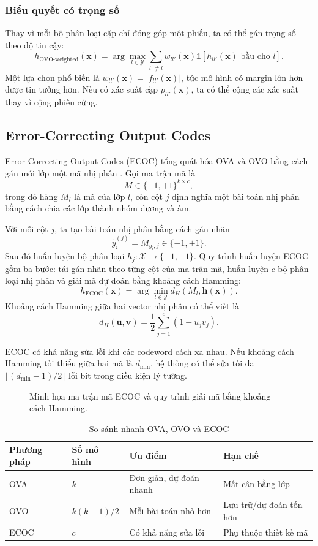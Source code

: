 \subsubsection{Biểu quyết có trọng số}

Thay vì mỗi bộ phân loại cặp chỉ đóng góp một phiếu, ta có thể gán trọng số theo độ tin cậy:
\[
  h_{\text{OVO-weighted}}(\bm{x})=\arg\max_{l\in\mathcal{Y}}\sum_{l'\neq l}w_{ll'}(\bm{x})\mathbb{1}[h_{ll'}(\bm{x})\text{ bầu cho }l].
\]
Một lựa chọn phổ biến là $w_{ll'}(\bm{x})=|f_{ll'}(\bm{x})|$, tức mô hình có margin lớn hơn được tin tưởng hơn. Nếu có xác suất cặp $p_{ll'}(\bm{x})$, ta có thể cộng các xác suất thay vì cộng phiếu cứng.

\subsection{Error-Correcting Output Codes}

Error-Correcting Output Codes (ECOC) tổng quát hóa OVA và OVO bằng cách gán mỗi lớp một mã nhị phân \cite{dietterich1995}. Gọi ma trận mã là
\[
  M\in\{-1,+1\}^{k\times c},
\]
trong đó hàng $M_l$ là mã của lớp $l$, còn cột $j$ định nghĩa một bài toán nhị phân bằng cách chia các lớp thành nhóm dương và âm.

Với mỗi cột $j$, ta tạo bài toán nhị phân bằng cách gán nhãn
\[
  \tilde{y}_i^{(j)}=M_{y_i,j}\in\{-1,+1\}.
\]
Sau đó huấn luyện bộ phân loại $h_j:\mathcal{X}\to\{-1,+1\}$. Quy trình huấn luyện ECOC gồm ba bước: tái gán nhãn theo từng cột của ma trận mã, huấn luyện $c$ bộ phân loại nhị phân và giải mã dự đoán bằng khoảng cách Hamming:
\[
  h_{\text{ECOC}}(\bm{x})=\arg\min_{l\in\mathcal{Y}} d_H(M_l,\bm{h}(\bm{x})).
\]
Khoảng cách Hamming giữa hai vector nhị phân có thể viết là
\[
  d_H(\bm{u},\bm{v})=\frac{1}{2}\sum_{j=1}^{c}(1-u_jv_j).
\]

ECOC có khả năng sửa lỗi khi các codeword cách xa nhau. Nếu khoảng cách Hamming tối thiểu giữa hai mã là $d_{\min}$, hệ thống có thể sửa tối đa $\lfloor(d_{\min}-1)/2\rfloor$ lỗi bit trong điều kiện lý tưởng.
\begin{figure}[H]
\centering
\resizebox{0.98\textwidth}{!}{}
\caption{Minh họa ma trận mã ECOC và quy trình giải mã bằng khoảng cách Hamming.}
\label{fig:ecoc-decoding}
\end{figure}


\begin{table}[H]
\centering
\caption{So sánh nhanh OVA, OVO và ECOC}
\small
\begin{tabularx}{\textwidth}{>{\raggedright\arraybackslash}p{2.6cm}>{\centering\arraybackslash}p{2.5cm}>{\raggedright\arraybackslash}X>{\raggedright\arraybackslash}X}
\toprule
\textbf{Phương pháp} & \textbf{Số mô hình} & \textbf{Ưu điểm} & \textbf{Hạn chế} \\
\midrule
OVA & $k$ & Đơn giản, dự đoán nhanh & Mất cân bằng lớp \\
OVO & $k(k-1)/2$ & Mỗi bài toán nhỏ hơn & Lưu trữ/dự đoán tốn hơn \\
ECOC & $c$ & Có khả năng sửa lỗi & Phụ thuộc thiết kế mã \\
\bottomrule
\end{tabularx}
\end{table}

